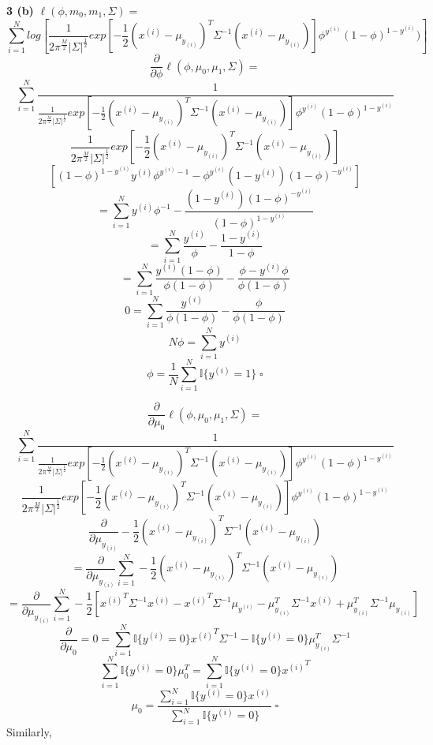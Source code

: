 \documentclass[12 pt]{article}        	%
\begin{document}
\textbf{3 (b)} $ \ell (\phi, m_0, m_1, \Sigma) = $
\[
  \sum_{i=1}^{N} log [ \frac{1}{2 \pi^{\frac{M}{2}} |\Sigma|^{\frac{1}{2}}} 
  exp[ - \frac{1}{2} (x^{(i)} - \mu_{y_{(i)}})^T \Sigma^{-1} (x^{(i)} - \mu_{y_{(i)}}) ] 
  \phi^{y^{(i)}} (1 - \phi)^{1 - y^{(i)}}) ]
\]
\[
  \frac{\partial}{\partial \phi} \ell (\phi, \mu_0, \mu_1, \Sigma) = 
\]
\[
  \sum_{i=1}^{N} \frac{1}{
    \frac{1}{2 \pi^{\frac{M}{2}} |\Sigma|^{\frac{1}{2}}} 
    exp[ - \frac{1}{2} (x^{(i)} - \mu_{y_{(i)}})^T \Sigma^{-1} (x^{(i)} - \mu_{y_{(i)}}) ] 
    \phi^{y^{(i)}} (1 - \phi)^{1 - y^{(i)}} 
  }
\]
\[
  \frac{1}{2 \pi^{\frac{M}{2}} |\Sigma|^{\frac{1}{2}}} 
  exp[ - \frac{1}{2} (x^{(i)} - \mu_{y_{(i)}})^T \Sigma^{-1} (x^{(i)} - \mu_{y_{(i)}}) ] 
\]
\[
  [ (1 - \phi)^{1 - y^{(i)}} y^{(i)} \phi^{y^{(i)} - 1}
  - \phi^{y^{(i)}} (1 - y^{(i)}) (1 - \phi)^{-y^{(i)}} ]
\]
\[
  = \sum_{i=1}^{N}
    y^{(i)} \phi^{-1}
    - \frac{
      (1 - y^{(i)}) (1 - \phi)^{-y^{(i)}}
    }{
      (1 - \phi)^{1 - y^{(i)}}
    }
\]
\[
  = \sum_{i=1}^{N}
  \frac{ y^{(i)} } { \phi }
    - \frac{
      1 - y^{(i)} 
    }{
      1 - \phi
    }
\]
\[
  = \sum_{i=1}^{N}
  \frac{ y^{(i)} ( 1 - \phi )} { \phi ( 1 - \phi )}
    - \frac{
      \phi - y^{(i)} \phi 
    }{
      \phi( 1 - \phi )
    }
\]
\[
  0 = \sum_{i=1}^{N}
  \frac{ y^{(i)} } 
  { \phi ( 1 - \phi )}
  - \frac{ \phi } 
  { \phi ( 1 - \phi )}
\]
\[
  N \phi  
  = 
  \sum_{i=1}^{N}
  y^{(i)}
\]
\[
  \phi  
  = \frac{1}{N}
  \sum_{i=1}^{N}
  \mathbb{I} \{ y^{(i)} = 1\} \; \square
\]

\[
  \frac{\partial}{\partial \mu_0} \ell (\phi, \mu_0, \mu_1, \Sigma) = 
\]
\[
  \sum_{i=1}^{N} \frac{1}{ 
    \frac{1}{2 \pi^{\frac{M}{2}} |\Sigma|^{\frac{1}{2}}} 
    exp[ - \frac{1}{2} (x^{(i)} - \mu_{y_{(i)}})^T \Sigma^{-1} (x^{(i)} - \mu_{y_{(i)}}) ] 
    \phi^{y^{(i)}} (1 - \phi)^{1 - y^{(i)}}
  }
\]
\[
  \frac{1}{2 \pi^{\frac{M}{2}} |\Sigma|^{\frac{1}{2}}}
  exp[ - \frac{1}{2} (x^{(i)} - \mu_{y_{(i)}})^T \Sigma^{-1} (x^{(i)} - \mu_{y_{(i)}}) ] 
  \phi^{y^{(i)}} (1 - \phi)^{1 - y^{(i)}}
\]
\[
  \frac{\partial}{\partial \mu_{y_{(i)}}} - \frac{1}{2} (x^{(i)} - \mu_{y_{(i)}})^T \Sigma^{-1} (x^{(i)} - \mu_{y_{(i)}})
\]
\[
  = \frac{\partial}{\partial \mu_{y_{(i)}}} \sum_{i=1}^{N} - \frac{1}{2} (x^{(i)} - \mu_{y_{(i)}})^T \Sigma^{-1} (x^{(i)} - \mu_{y_{(i)}})
\]
\[
  = \frac{\partial} {\partial \mu_{y_{(i)}}} \sum_{i=1}^{N} 
  - \frac{1}{2} 
  [
    {x^{(i)}}^T \Sigma^{-1} x^{(i)} 
    - {x^{(i)}}^T \Sigma^{-1} \mu_{y^(i)}
    - \mu_{y_{(i)}}^T \Sigma^{-1} x^{(i)}
    + \mu_{y_{(i)}}^T \Sigma^{-1} \mu_{y_{(i)}}
  ]
\]
\[
  \frac{\partial} {\partial \mu_0} = 0 = \sum_{i=1}^{N} 
  \mathbb{I} \{ y^{(i)} = 0 \} {x^{(i)}}^T \Sigma^{-1} 
    - \mathbb{I} \{ y^{(i)} = 0 \} \mu_{y_{(i)}}^T \Sigma^{-1}
\]
\[
  \sum_{i=1}^{N} \mathbb{I} \{ y^{(i)} = 0 \} \mu_{0}^T = \sum_{i=1}^{N} 
    \mathbb{I} \{ y^{(i)} = 0 \} {x^{(i)}}^T
\]
\[
  \mu_{0} = \frac{ 
    \sum_{i=1}^{N} 
    \mathbb{I} \{ y^{(i)} = 0 \} {x^{(i)}}
  }{
    \sum_{i=1}^{N} \mathbb{I} \{ y^{(i)} = 0 \}
  } \; \square
\]
Similarly, 
\end{document}
